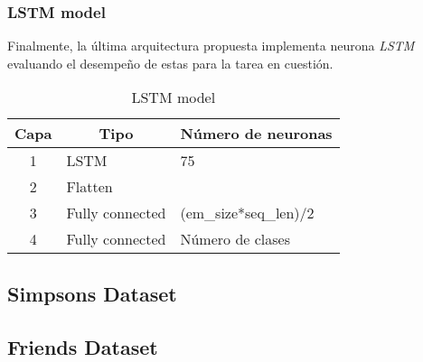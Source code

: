 \subsubsection{LSTM model}
Finalmente, la última arquitectura propuesta implementa neurona \textit{LSTM} evaluando el desempeño de estas para la tarea en cuestión.

\begin{table}[H]
\centering
\caption{LSTM model}
\label{tab:LSTM_1}
\begin{tabular}{|c|l|l|}
\hline
\textbf{Capa} & \multicolumn{1}{c|}{\textbf{Tipo}} & \multicolumn{1}{c|}{\textbf{Número de neuronas}} \\ \hline
1             & LSTM                               & 75                                               \\ \hline
2             & Flatten                            &                                                  \\ \hline
3             & Fully connected                    & (em\_size*seq\_len)/2                            \\ \hline
4             & Fully connected                    & Número de clases                                 \\ \hline
\end{tabular}
\end{table}

\subsection{Simpsons Dataset}


\subsection{Friends Dataset}